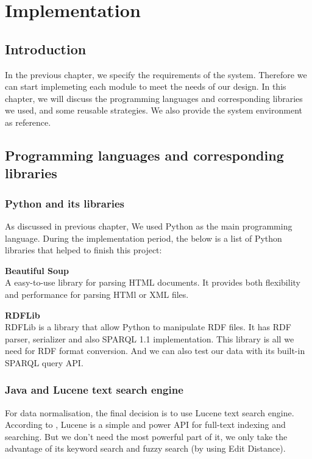 \chapter{Implementation}\label{chap:impl}

\section{Introduction}
In the previous chapter, we specify the requirements of the system. Therefore we can start implemeting each module to meet the needs of our design. In this chapter, we will discuss the programming languages and corresponding libraries we used, and some reusable strategies. We also provide the system environment as reference.

\section{Programming languages and corresponding libraries}

\subsection{Python and its libraries}
As discussed in previous chapter, We used Python as the main programming language. During the implementation period, the below is a list of Python libraries that helped to finish this project:
\begin{description}
	\item \textbf{Beautiful Soup} \hfill \\
	A easy-to-use library for parsing HTML documents. It provides both flexibility and performance for parsing HTMl or XML files.
	\item \textbf{RDFLib} \hfill \\
	RDFLib is a library that allow Python to manipulate RDF files. It has RDF parser, serializer and also SPARQL 1.1 implementation. This library is all we need for RDF format conversion. And we can also test our data with its built-in SPARQL query API.
\end{description}

\subsection{Java and Lucene text search engine}
For data normalisation, the final decision is to use Lucene text search engine. According to \cite{McCandless2010LAS}, Lucene is a simple and power API for full-text indexing and searching. But we don't need the most powerful part of it, we only take the advantage of its keyword search and fuzzy search (by using Edit Distance\cite{Cormen2001IA}).

